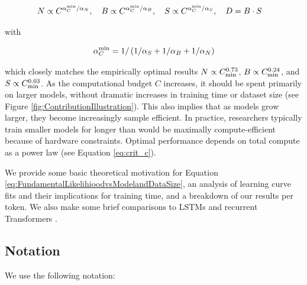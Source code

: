 \begin{equation}
\label{eq:OptimalModelSizeTrainingTimevsCompute}
N \propto C^{\alpha_{C}^{\rm min} /\alpha_{N}}, \quad
B \propto C^{\alpha_C^{\rm min} / \alpha_B}, \quad
S \propto C^{\alpha_C^{\rm min} / \alpha_S}, \quad
D = B\cdot S \quad
\end{equation}

with

\begin{equation}
\alpha_{C}^{\rm min} = 1/\left(1/\alpha_{S}+1/\alpha_{B}+1/\alpha_{N}\right) 
\end{equation}

which closely matches the empirically optimal results $N \propto C_{\rm min}^{0.73}$, $B \propto C_{\rm min}^{0.24}$, and $S \propto C_{\rm min}^{0.03}$.  As the computational budget $C$ increases, it should be spent primarily on larger models, without dramatic increases in training time or dataset size (see Figure \ref{fig:ContributionIllustration}).  This also implies that as models grow larger, they  become increasingly sample efficient.  In practice, researchers typically train  smaller models for  longer than would be maximally compute-efficient because of  hardware constraints. Optimal performance depends on total compute as a power law (see Equation \eqref{eq:crit_c}).

We  provide some basic theoretical motivation for Equation \eqref{eq:FundamentalLikelihioodvsModelandDataSize}, an analysis of learning curve fits and their implications for training time, and a breakdown of our results per token.  We also make some brief comparisons to LSTMs and recurrent Transformers \cite{DBLP:journals/corr/abs-1807-03819}.

\subsection{Notation}

We use the following notation:

